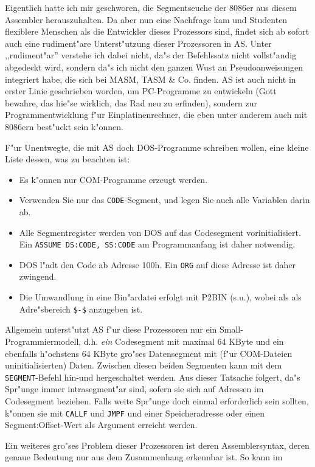 \documentclass[12pt,a4paper,twoside]{report}
\newcommand{\ii}[1]{{\it #1}}
\newcommand{\tty}[1]{{\tt #1}}
\begin{document}
{Eigentlich hatte ich mir geschworen, die Segmentseuche der 8086er aus diesem
Assembler herauszuhalten.  Da aber nun eine Nachfrage kam und Studenten
flexiblere Menschen als die Entwickler dieses Prozessors sind, findet sich
ab sofort auch eine rudiment"are Unterst"utzung dieser Prozessoren in AS.
Unter ,,rudiment"ar'' verstehe ich dabei nicht, da"s der Befehlssatz nicht
vollst"andig abgedeckt wird, sondern da"s ich nicht den ganzen Wust an
Pseudoanweisungen integriert habe, die sich bei MASM, TASM \& Co. finden.
AS ist auch nicht in erster Linie geschrieben worden, um PC-Programme zu
entwickeln (Gott bewahre, das hie"se wirklich, das Rad neu zu erfinden),
sondern zur Programmentwicklung f"ur Einplatinenrechner, die eben unter
anderem auch mit 8086ern best"uckt sein k"onnen.
\par
F"ur Unentwegte, die mit AS doch DOS-Programme schreiben wollen, eine kleine
Liste dessen, was zu beachten ist:
\begin{itemize}
\item{Es k"onnen nur COM-Programme erzeugt werden.}
\item{Verwenden Sie nur das \tty{CODE}-Segment, und legen Sie auch alle
      Variablen darin ab.}
\item{Alle Segmentregister werden von DOS auf das Codesegment
      vorinitialisiert.  Ein \tty{ASSUME DS:CODE, SS:CODE} am
      Programmanfang ist daher notwendig.}
\item{DOS l"adt den Code ab Adresse 100h.  Ein \tty{ORG} auf diese
      Adresse ist daher zwingend.}
\item{Die Umwandlung in eine Bin"ardatei erfolgt mit P2BIN (s.u.), wobei als
      als Adre"sbereich \tty{\$-\$} anzugeben ist.}
\end{itemize}
Allgemein unterst"utzt AS f"ur diese Prozessoren nur ein Small-Programmiermodell, d.h.
\ii{ein} Codesegment mit maximal 64 KByte und ein ebenfalls h"ochstens 64
KByte gro"ses Datensegment mit (f"ur COM-Dateien uninitialisierten) Daten.
Zwischen diesen beiden Segmenten kann mit dem \tty{SEGMENT}-Befehl hin-und hergeschaltet werden. 
Aus dieser Tatsache folgert, da"s Spr"unge immer intrasegment"ar sind,
sofern sie sich auf Adressen im Codesegment beziehen.  Falls weite Spr"unge
doch einmal erforderlich sein sollten, k"onnen sie mit \tty{CALLF} und
\tty{JMPF} und einer Speicheradresse oder einen Segment:Offset-Wert als 
Argument erreicht werden.
\par
Ein weiteres gro"ses Problem dieser Prozessoren ist deren Assemblersyntax,
deren genaue Bedeutung nur aus dem Zusammenhang erkennbar ist.  So kann im
}
\end{document}
